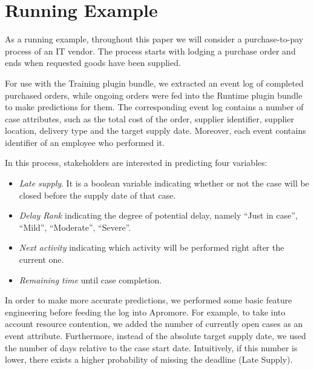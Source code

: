 \documentclass[runningheads,a4paper]{llncs}
\begin{document}
\section{Running Example}
As a running example, throughout this paper we will consider a purchase-to-pay process of an IT vendor. The process starts with lodging a purchase order and ends when requested goods have been supplied. 

For use with the Training plugin bundle, we extracted an event log of completed purchased orders, while ongoing orders were fed into the Runtime plugin bundle to make predictions for them. The corresponding event log contains a number of case attributes, such as the total cost of the order, supplier identifier, supplier location, delivery type and the target supply date. Moreover, each event contains identifier of an employee who performed it.

In this process, stakeholders are interested in predicting four variables:
\begin{itemize}
	\item \emph{Late supply}. It is a boolean variable indicating whether or not the case will be closed before the supply date of that case.
	\item \emph{Delay Rank} indicating the degree of potential delay, namely ``Just in case'', ``Mild'', ``Moderate'', ``Severe''.
	\item \emph{Next activity} indicating which activity will be performed right after the current one.
	\item \emph{Remaining time} until case completion.
\end{itemize}

In order to make more accurate predictions, we performed some basic feature engineering before feeding the log into Apromore. For example, to take into account resource contention, we added the number of currently open cases as an event attribute. Furthermore, instead of the absolute target supply date, we used the number of days relative to the case start date. Intuitively, if this number is lower, there exists a higher probability of missing the deadline (Late Supply).
\end{document}
